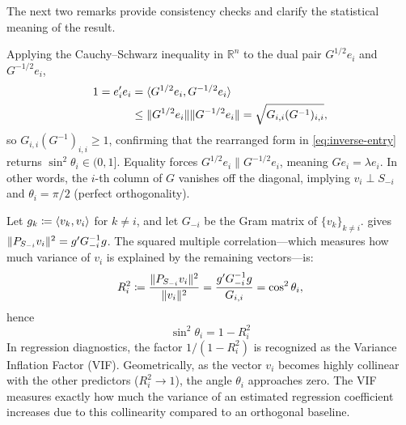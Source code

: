 \documentclass{IEEEtran}
\begin{document}
The next two remarks provide consistency checks and clarify the statistical meaning of the result.

\begin{remark}
  \label{rem:cs-check}
  Applying the Cauchy--Schwarz inequality in $\mathbb{R}^{n}$ to the dual pair $G^{1/2} e_{i}$ and $G^{-1/2} e_{i}$,
  \begin{equation}\label{eq:cs-dual}
    \begin{aligned}
      1 = e_{i}^{\prime} e_{i} &= \langle G^{1/2} e_{i}, G^{-1/2} e_{i}\rangle \\
      &\le  \lVert G^{1/2} e_{i}\rVert \lVert G^{-1/2} e_{i}\rVert = \sqrt{G_{i,i}(G^{-1})_{i,i}} ,
    \end{aligned}
  \end{equation}
  so $G_{i,i}(G^{-1})_{i,i} \ge 1$, confirming that the rearranged form in \eqref{eq:inverse-entry} returns $\sin^{2}\theta_{i} \in (0,1]$. Equality forces $G^{1/2}e_{i} \parallel G^{-1/2}e_{i}$, meaning $G e_{i} = \lambda e_{i}$. In other words, the $i$-th column of $G$ vanishes off the diagonal, implying $v_{i} \perp S_{-i}$ and $\theta_{i} = \pi/2$ (perfect orthogonality).
\end{remark}

\begin{remark}
  \label{rem:R2}
  Let $g_{k} \coloneq \langle v_{k}, v_{i}\rangle$ for $k \neq i$, and let $G_{-i}$ be the Gram matrix of $\{v_{k}\}_{k\neq i}$.  gives $\lVert P_{S_{-i}} v_{i}\rVert^{2} = g^{\prime} G_{-i}^{-1} g$. The squared multiple correlation---which measures how much variance of $v_{i}$ is explained by the remaining vectors---is:
  \begin{equation}
    R_{i}^{2} \coloneq \frac{\lVert P_{S_{-i}} v_{i}\rVert^{2}}{\lVert v_{i}\rVert^{2}}
    = \frac{g^{\prime} G_{-i}^{-1} g}{G_{i,i}}
    = \cos^{2}\theta_{i} ,
    \label{eq:R2}
  \end{equation}
  hence
  \begin{equation*}
    \sin^{2}\theta_{i} = 1 - R_{i}^{2}
  \end{equation*}
  In regression diagnostics, the factor $1/(1-R_{i}^{2})$ is recognized as the Variance Inflation Factor (VIF). Geometrically, as the vector $v_{i}$ becomes highly collinear with the other predictors ($R_{i}^{2} \to 1$), the angle $\theta_{i}$ approaches zero. The VIF measures exactly how much the variance of an estimated regression coefficient increases due to this collinearity compared to an orthogonal baseline.
\end{remark}
\end{document}
